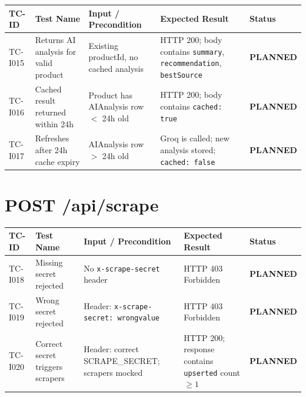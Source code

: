 \documentclass[12pt,a4paper]{report}
\newcommand{\PEND}{\textcolor{pendyellow}{\textbf{PLANNED}}}
\begin{document}
\begin{longtable}{C{1.6cm} L{4cm} L{4cm} L{3.5cm} C{1.5cm}}
  \toprule
  \textbf{TC-ID} & \textbf{Test Name} & \textbf{Input / Precondition} & \textbf{Expected Result} & \textbf{Status} \\
  \midrule
  \endhead
  \bottomrule
  \endlastfoot

  TC-I015 &
    Returns AI analysis for valid product &
    Existing productId, no cached analysis &
    HTTP 200; body contains \texttt{summary}, \texttt{recommendation},
    \texttt{bestSource} &
    \PEND \\

  TC-I016 &
    Cached result returned within 24h &
    Product has AIAnalysis row $<$ 24h old &
    HTTP 200; body contains \texttt{cached: true} &
    \PEND \\

  TC-I017 &
    Refreshes after 24h cache expiry &
    AIAnalysis row $>$ 24h old &
    Groq is called; new analysis stored; \texttt{cached: false} &
    \PEND \\

\end{longtable}

\section{POST /api/scrape}

\begin{longtable}{C{1.6cm} L{4cm} L{4cm} L{3.5cm} C{1.5cm}}
  \toprule
  \textbf{TC-ID} & \textbf{Test Name} & \textbf{Input / Precondition} & \textbf{Expected Result} & \textbf{Status} \\
  \midrule
  \endhead
  \bottomrule
  \endlastfoot

  TC-I018 &
    Missing secret rejected &
    No \texttt{x-scrape-secret} header &
    HTTP 403 Forbidden &
    \PEND \\

  TC-I019 &
    Wrong secret rejected &
    Header: \texttt{x-scrape-secret: wrongvalue} &
    HTTP 403 Forbidden &
    \PEND \\

  TC-I020 &
    Correct secret triggers scrapers &
    Header: correct SCRAPE\_SECRET; scrapers mocked &
    HTTP 200; response contains \texttt{upserted} count $\geq 1$ &
    \PEND \\

\end{longtable}
\end{document}
